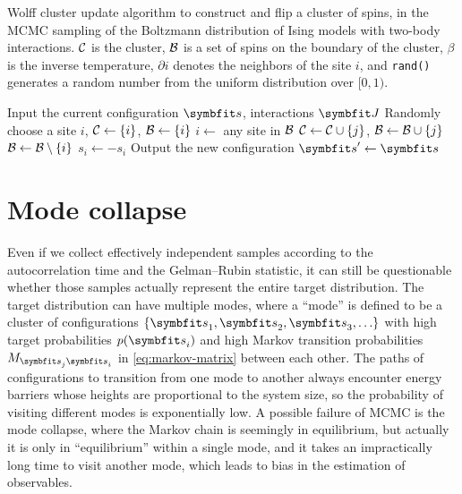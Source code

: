 \begin{algorithm}[H]
\caption[Wolff cluster update]{
Wolff cluster update algorithm to construct and flip a cluster of spins, in the MCMC sampling of the Boltzmann distribution of Ising models with two-body interactions.
$\mathcal{C}$ is the cluster, $\mathcal{B}$ is a set of spins on the boundary of the cluster, $\beta$ is the inverse temperature, $\partial i$ denotes the neighbors of the site $i$, and \texttt{rand()} generates a random number from the uniform distribution over $[0, 1)$.
}
\label{alg:wolff}
\begin{algorithmic}[1]
\STATE Input the current configuration $\vs$, interactions $\mJ$
\STATE Randomly choose a site $i$, $\mathcal{C} \gets \{i\}$, $\mathcal{B} \gets \{i\}$
\WHILE{$\calB \neq \emptyset$}
    \STATE $i \gets$ any site in $\mathcal{B}$
            \STATE $\mathcal{C} \gets \mathcal{C} \cup \{j\}$, $\mathcal{B} \gets \mathcal{B} \cup \{j\}$
        \ENDIF
    \ENDFOR
    \STATE $\mathcal{B} \gets \mathcal{B} \setminus \{i\}$
\ENDWHILE
{}
    \STATE $s_i \gets -s_i$
\ENDFOR
\STATE Output the new configuration $\vs' \gets \vs$
\end{algorithmic}
\end{algorithm}

\section{Mode collapse}
\label{sec:mode-collapse}

Even if we collect effectively independent samples according to the autocorrelation time and the Gelman--Rubin statistic, it can still be questionable whether those samples actually represent the entire target distribution. The target distribution can have multiple modes, where a ``mode'' is defined to be a cluster of configurations $\{\vs_1, \vs_2, \vs_3, \ldots\}$ with high target probabilities $p(\vs_i)$ and high Markov transition probabilities $M_{\vs_j \vs_i}$ in \cref{eq:markov-matrix} between each other. The paths of configurations to transition from one mode to another always encounter energy barriers whose heights are proportional to the system size, so the probability of visiting different modes is exponentially low. A possible failure of MCMC is the mode collapse, where the Markov chain is seemingly in equilibrium, but actually it is only in ``equilibrium'' within a single mode, and it takes an impractically long time to visit another mode, which leads to bias in the estimation of observables.

